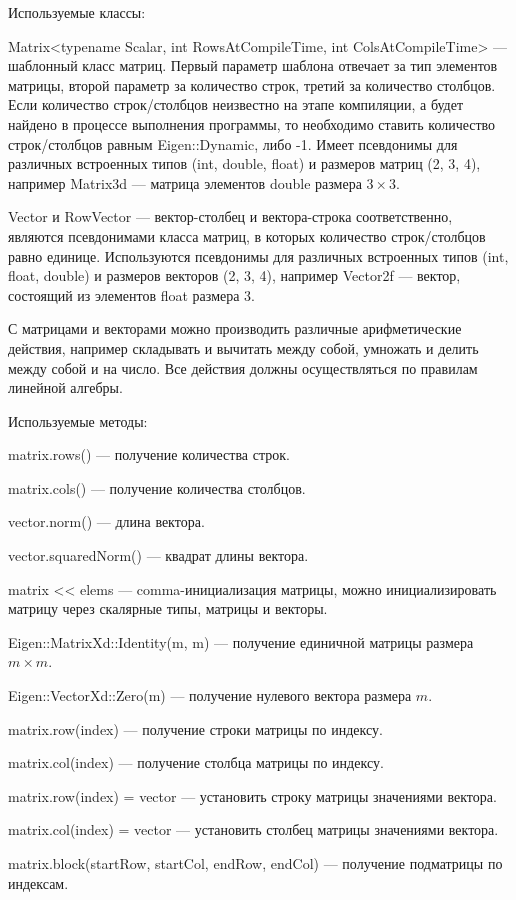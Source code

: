 Используемые классы:

Matrix<typename Scalar, int RowsAtCompileTime, int ColsAtCompileTime> --- шаблонный класс матриц. Первый параметр шаблона отвечает за тип элементов матрицы, второй параметр за количество строк, третий за количество столбцов. Если количество строк/столбцов неизвестно на этапе компиляции, а будет найдено в процессе выполнения программы, то необходимо ставить количество строк/столбцов равным Eigen::Dynamic, либо -1. Имеет псевдонимы для различных встроенных типов (int, double, float) и размеров матриц (2, 3, 4), например Matrix3d --- матрица элементов double размера $ 3 \times 3 $. 

Vector и RowVector --- вектор-столбец и вектора-строка соответственно, являются псевдонимами класса матриц, в которых количество строк/столбцов равно единице. Используются псевдонимы для различных встроенных типов (int, float, double) и размеров векторов (2, 3, 4), например Vector2f --- вектор, состоящий из элементов float размера $ 3 $.

С матрицами и векторами можно производить различные арифметические действия, например складывать и вычитать между собой, умножать и делить между собой и на число. Все действия должны осуществляться по правилам линейной алгебры. 

Используемые методы:

matrix.rows() --- получение количества строк.

matrix.cols() --- получение количества столбцов.

vector.norm() --- длина вектора.

vector.squaredNorm() --- квадрат длины вектора.

matrix << elems --- comma-инициализация матрицы, можно инициализировать матрицу через скалярные типы, матрицы и векторы.

Eigen::MatrixXd::Identity(m, m) --- получение единичной матрицы размера $ m \times m $.

Eigen::VectorXd::Zero(m) --- получение нулевого вектора размера $ m $.

matrix.row(index) --- получение строки матрицы по индексу.

matrix.col(index) --- получение столбца матрицы по индексу.

matrix.row(index) = vector --- установить строку матрицы значениями вектора.

matrix.col(index) = vector --- установить столбец матрицы значениями вектора.

matrix.block(startRow, startCol, endRow, endCol) --- получение подматрицы по индексам.

